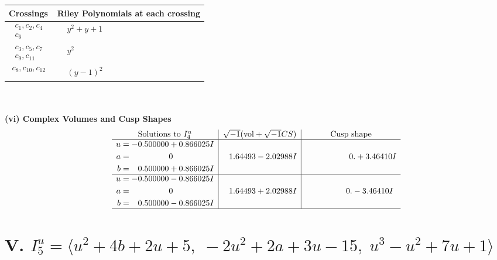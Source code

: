 \documentclass[1p]{elsarticle_modified}
\theoremstyle{definition}
\newcommand{\I}{\sqrt{-1}}
\begin{document}
\begin{tabular}{m{50pt}|m{274pt}}
Crossings & \hspace{64pt}Riley Polynomials at each crossing \\
\hline $$\begin{aligned}c_{1},c_{2},c_{4}\\c_{6}\end{aligned}$$&$\begin{aligned}
&y^2+y+1
\end{aligned}$\\
\hline $$\begin{aligned}c_{3},c_{5},c_{7}\\c_{9},c_{11}\end{aligned}$$&$\begin{aligned}
&y^2
\end{aligned}$\\
\hline $$\begin{aligned}c_{8},c_{10},c_{12}\end{aligned}$$&$\begin{aligned}
&(y-1)^2
\end{aligned}$\\
\hline
\end{tabular}\\~\\
\newpage\flushleft \textbf{(vi) Complex Volumes and Cusp Shapes}
$$\begin{array}{c|c|c}  
\text{Solutions to }I^u_{4}& \I (\text{vol} + \sqrt{-1}CS) & \text{Cusp shape}\\
 \hline 
\begin{aligned}
u &= -0.500000 + 0.866025 I \\
a &= \phantom{-0.000000 } 0 \\
b &= \phantom{-}0.500000 + 0.866025 I\end{aligned}
 & \phantom{-}1.64493 - 2.02988 I & \phantom{-0.000000 -}0. + 3.46410 I \\ \hline\begin{aligned}
u &= -0.500000 - 0.866025 I \\
a &= \phantom{-0.000000 } 0 \\
b &= \phantom{-}0.500000 - 0.866025 I\end{aligned}
 & \phantom{-}1.64493 + 2.02988 I & \phantom{-0.000000 } 0. - 3.46410 I\\
 \hline 
 \end{array}$$\newpage\newpage\renewcommand{\arraystretch}{1}
\centering \section*{V. $I^u_{5}= \langle u^2+4 b+2 u+5,\;-2 u^2+2 a+3 u-15,\;u^3- u^2+7 u+1 \rangle$}
\end{document}
